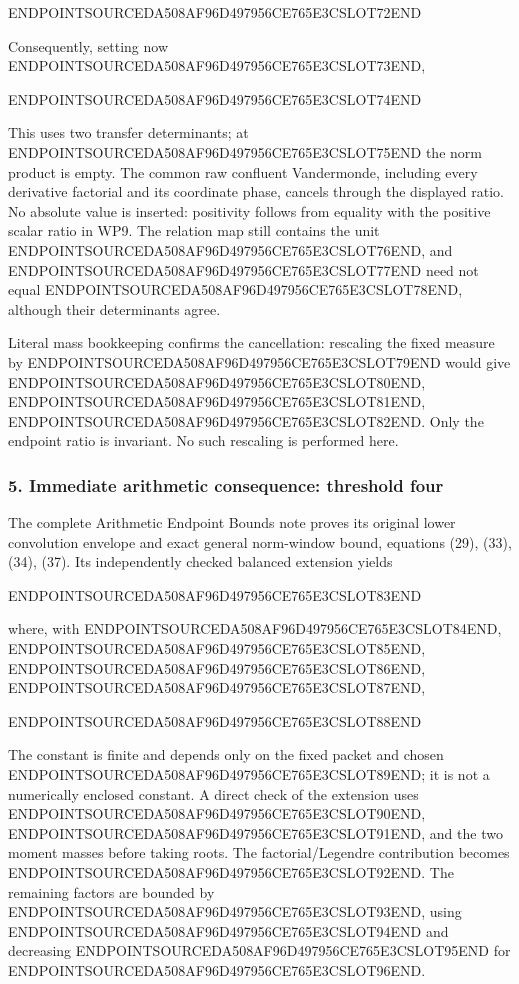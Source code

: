 ENDPOINTSOURCEDA508AF96D497956CE765E3CSLOT72END

Consequently, setting now ENDPOINTSOURCEDA508AF96D497956CE765E3CSLOT73END,

ENDPOINTSOURCEDA508AF96D497956CE765E3CSLOT74END

This uses two transfer determinants; at ENDPOINTSOURCEDA508AF96D497956CE765E3CSLOT75END the norm product is empty. The common raw confluent Vandermonde, including every derivative factorial and its coordinate phase, cancels through the displayed ratio. No absolute value is inserted: positivity follows from equality with the positive scalar ratio in WP9. The relation map still contains the unit ENDPOINTSOURCEDA508AF96D497956CE765E3CSLOT76END, and ENDPOINTSOURCEDA508AF96D497956CE765E3CSLOT77END need not equal ENDPOINTSOURCEDA508AF96D497956CE765E3CSLOT78END, although their determinants agree.

Literal mass bookkeeping confirms the cancellation: rescaling the fixed measure by ENDPOINTSOURCEDA508AF96D497956CE765E3CSLOT79END would give ENDPOINTSOURCEDA508AF96D497956CE765E3CSLOT80END, ENDPOINTSOURCEDA508AF96D497956CE765E3CSLOT81END, ENDPOINTSOURCEDA508AF96D497956CE765E3CSLOT82END. Only the endpoint ratio is invariant. No such rescaling is performed here.

\subsubsection{5. Immediate arithmetic consequence: threshold four}\label{endpoint-window_product_owner--immediate-arithmetic-consequence-threshold-four}

The complete Arithmetic Endpoint Bounds note proves its original lower convolution envelope and exact general norm-window bound, equations (29), (33), (34), (37). Its independently checked balanced extension yields

ENDPOINTSOURCEDA508AF96D497956CE765E3CSLOT83END

where, with ENDPOINTSOURCEDA508AF96D497956CE765E3CSLOT84END, ENDPOINTSOURCEDA508AF96D497956CE765E3CSLOT85END, ENDPOINTSOURCEDA508AF96D497956CE765E3CSLOT86END, ENDPOINTSOURCEDA508AF96D497956CE765E3CSLOT87END,

ENDPOINTSOURCEDA508AF96D497956CE765E3CSLOT88END

The constant is finite and depends only on the fixed packet and chosen ENDPOINTSOURCEDA508AF96D497956CE765E3CSLOT89END; it is not a numerically enclosed constant. A direct check of the extension uses ENDPOINTSOURCEDA508AF96D497956CE765E3CSLOT90END, ENDPOINTSOURCEDA508AF96D497956CE765E3CSLOT91END, and the two moment masses before taking roots. The factorial/Legendre contribution becomes ENDPOINTSOURCEDA508AF96D497956CE765E3CSLOT92END. The remaining factors are bounded by ENDPOINTSOURCEDA508AF96D497956CE765E3CSLOT93END, using ENDPOINTSOURCEDA508AF96D497956CE765E3CSLOT94END and decreasing ENDPOINTSOURCEDA508AF96D497956CE765E3CSLOT95END for ENDPOINTSOURCEDA508AF96D497956CE765E3CSLOT96END.

